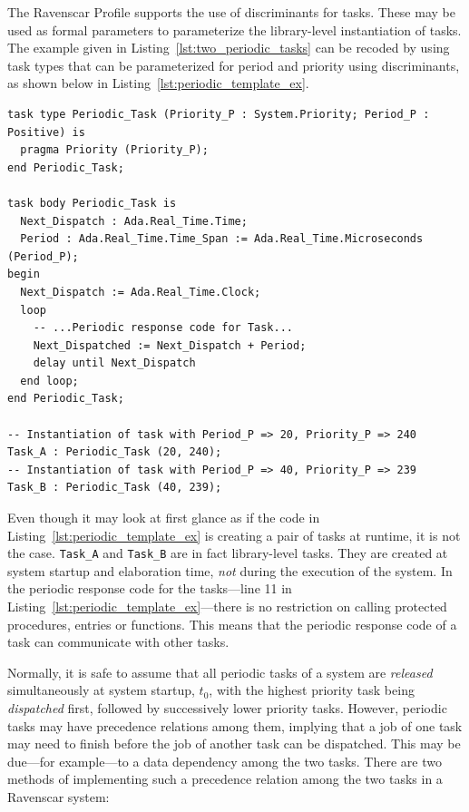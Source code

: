 The Ravenscar Profile supports the use of discriminants for tasks.
These may be used as formal parameters to parameterize the
library-level instantiation of tasks. The example given in
Listing~\ref{lst:two_periodic_tasks} can be recoded by using task
types that can be parameterized for period and priority using
discriminants, as shown below in
Listing~\ref{lst:periodic_template_ex}.

\begin{minipage}{\listingwidth}
\lstset{language=ada,
  numbers=left,
  numberstyle=\tiny
}
\begin{lstlisting}[firstnumber=1, label=lst:periodic_template_ex,
    caption=Two Ravenscar periodic tasks instantiated from templates.]
task type Periodic_Task (Priority_P : System.Priority; Period_P : Positive) is
  pragma Priority (Priority_P);
end Periodic_Task;

task body Periodic_Task is
  Next_Dispatch : Ada.Real_Time.Time;
  Period : Ada.Real_Time.Time_Span := Ada.Real_Time.Microseconds (Period_P);
begin
  Next_Dispatch := Ada.Real_Time.Clock;
  loop
    -- ...Periodic response code for Task...
    Next_Dispatched := Next_Dispatch + Period;
    delay until Next_Dispatch
  end loop;
end Periodic_Task;

-- Instantiation of task with Period_P => 20, Priority_P => 240
Task_A : Periodic_Task (20, 240);
-- Instantiation of task with Period_P => 40, Priority_P => 239
Task_B : Periodic_Task (40, 239);
\end{lstlisting}
\end{minipage}

Even though it may look at first glance as if the code in
Listing~\ref{lst:periodic_template_ex} is creating a pair of tasks at
runtime, it is not the case. \texttt{Task\_A} and \texttt{Task\_B} are
in fact library-level tasks. They are created at system startup and
elaboration time, \emph{not} during the execution of the system. In
the periodic response code for the tasks---line 11 in
Listing~\ref{lst:periodic_template_ex}---there is no restriction on
calling protected procedures, entries or functions. This means that
the periodic response code of a task can communicate with other
tasks.

Normally, it is safe to assume that all periodic tasks of a system are
\emph{released} simultaneously at system startup, $t_0$, with the
highest priority task being \emph{dispatched} first, followed by
successively lower priority tasks. However, periodic tasks may have
precedence relations among them, implying that a job of one task may
need to finish before the job of another task can be dispatched. This
may be due---for example---to a data dependency among the two
tasks. There are two methods of implementing such a precedence
relation among the two tasks in a Ravenscar system:

